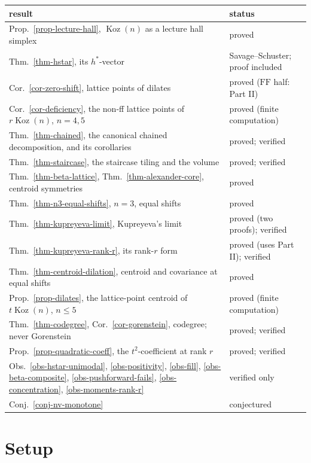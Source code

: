\documentclass[11pt, a4paper, abstract=yes]{scrartcl}
\theoremstyle{definition}
\theoremstyle{remark}
\theoremstyle{plain}
\theoremstyle{remark}
\theoremstyle{plain}
\newcommand{\Koz}{\operatorname{Koz}}
\newcommand{\FF}{\mathrm{FF}}
\begin{document}
\begin{center}\footnotesize
\begin{tabular}{@{}ll@{}}
\toprule
result & status\\
\midrule
Prop.~\ref{prop-lecture-hall}, \(\Koz(n)\) as a lecture hall simplex & proved\\
Thm.~\ref{thm-hstar}, its \(h^*\)-vector & Savage--Schuster; proof included\\
Cor.~\ref{cor-zero-shift}, lattice points of dilates & proved (\(\FF\) half: Part II)\\
Cor.~\ref{cor-deficiency}, the non-ff lattice points of \(r\Koz(n)\), \(n=4,5\) & proved (finite computation)\\
Thm.~\ref{thm-chained}, the canonical chained decomposition, and its corollaries & proved; verified\\
Thm.~\ref{thm-staircase}, the staircase tiling and the volume & proved; verified\\
Thm.~\ref{thm-beta-lattice}, Thm.~\ref{thm-alexander-core}, centroid symmetries & proved\\
Thm.~\ref{thm-n3-equal-shifts}, \(n=3\), equal shifts & proved\\
Thm.~\ref{thm-kupreyeva-limit}, Kupreyeva's limit & proved (two proofs); verified\\
Thm.~\ref{thm-kupreyeva-rank-r}, its rank-\(r\) form & proved (uses Part II); verified\\
Thm.~\ref{thm-centroid-dilation}, centroid and covariance at equal shifts & proved\\
Prop.~\ref{prop-dilates}, the lattice-point centroid of \(t\Koz(n)\), \(n\le5\) & proved (finite computation)\\
Thm.~\ref{thm-codegree}, Cor.~\ref{cor-gorenstein}, codegree; never Gorenstein & proved; verified\\
Prop.~\ref{prop-quadratic-coeff}, the \(t^2\)-coefficient at rank \(r\) & proved; verified\\
Obs.~\ref{obs-hstar-unimodal}, \ref{obs-positivity}, \ref{obs-fill}, \ref{obs-beta-composite}, \ref{obs-pushforward-fails}, \ref{obs-concentration}, \ref{obs-moments-rank-r} & verified only\\
Conj.~\ref{conj-nv-monotone} & conjectured\\
\bottomrule
\end{tabular}
\end{center}
\section{Setup}
\label{sec-setup}
\end{document}

